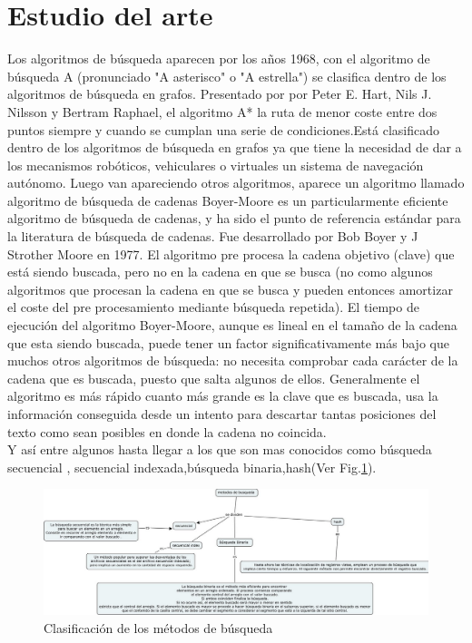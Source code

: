 \documentclass[11pt,a4paper]{article}
\begin{document}
\section{Estudio del arte}
Los algoritmos de búsqueda aparecen por los años 1968, con el algoritmo de búsqueda A (pronunciado "A asterisco" o "A estrella") se clasifica dentro de los algoritmos de búsqueda en grafos. Presentado por por Peter E. Hart, Nils J. Nilsson y Bertram Raphael, el algoritmo A* la ruta de menor coste entre dos puntos siempre y cuando se
cumplan una serie de condiciones.Está clasificado dentro de los algoritmos de búsqueda
en grafos ya que tiene la necesidad de dar a los mecanismos robóticos, vehiculares o
virtuales un sistema de navegación autónomo.
Luego van apareciendo otros algoritmos, aparece un algoritmo llamado algoritmo de búsqueda de cadenas Boyer-Moore es un particularmente eficiente algoritmo de búsqueda de cadenas, y ha sido el punto de referencia estándar para la literatura de búsqueda de cadenas. Fue desarrollado por Bob Boyer y J Strother Moore en 1977. El algoritmo pre procesa la cadena objetivo (clave) que está siendo buscada, pero no en la cadena en que se busca (no como algunos algoritmos que procesan la cadena en que se busca y pueden entonces amortizar el coste del pre procesamiento mediante búsqueda repetida). El tiempo de ejecución del algoritmo Boyer-Moore, aunque es lineal en el tamaño de la cadena que esta siendo buscada, puede tener un factor significativamente más bajo que muchos otros algoritmos de búsqueda: no necesita comprobar cada carácter de la cadena que es buscada, puesto que salta algunos de ellos. Generalmente el algoritmo es más rápido cuanto más grande es la clave que es buscada, usa la información conseguida desde un intento para descartar tantas posiciones del texto como sean posibles en donde la cadena no coincida.\\
Y así entre algunos hasta llegar a los que son mas conocidos como búsqueda secuencial , secuencial indexada,búsqueda binaria,hash(Ver Fig.\ref{figmet}).

\begin{figure}
\centering
\includegraphics[scale=0.5]{clasif}
\caption{Clasificación de los métodos de búsqueda}
\label{figmet}
\end{figure}
\end{document}
